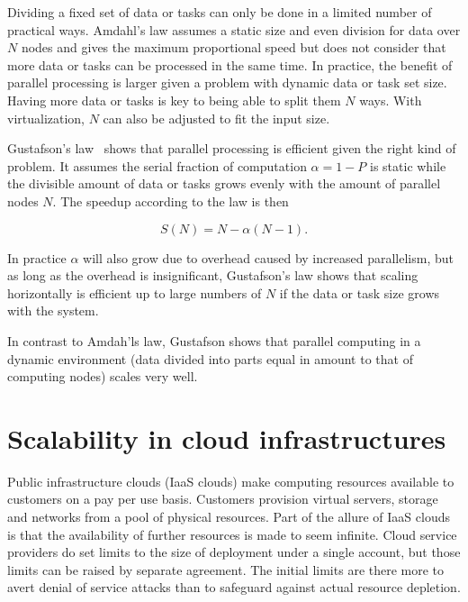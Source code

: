 \documentclass[english]{tktltiki2}
\theoremstyle{definition}
\theoremstyle{remark}
\begin{document}
Dividing a fixed set of data or tasks can only be done in a limited number of
practical ways. Amdahl’s law assumes a static size and even division for data
over $N$ nodes and gives the maximum proportional speed but does not consider
that more data or tasks can be processed in the same time. In practice, the
benefit of parallel processing is larger given a problem with dynamic data or
task set size. Having more data or tasks is key to being able to split them $N$
ways. With virtualization, $N$ can also be adjusted to fit the input size.

Gustafson’s law~\cite{gustafsonslaw} shows that parallel processing is efficient
given the right kind of problem. It assumes the serial fraction of computation
$\alpha=1-P$ is static while the divisible amount of data or tasks grows evenly
with the amount of parallel nodes $N$. The speedup  according to the law is then

\[
S(N) = N - \alpha(N-1).
\]

In practice $\alpha$ will also grow due to overhead caused by increased
parallelism, but as long as the overhead is insignificant, Gustafson’s law shows
that scaling horizontally is efficient up to large numbers of $N$ if the data or
task size grows with the system.

In contrast to Amdah’ls law, Gustafson shows that parallel computing in a
dynamic environment (data divided into parts equal in amount to that of
computing nodes) scales very well.




\section{Scalability in cloud infrastructures}
\label{sec:cloudscalability}

Public infrastructure clouds (IaaS clouds) make computing resources available to
customers on a pay per use basis. Customers provision virtual servers, storage
and networks from a pool of physical resources. Part of the allure of IaaS
clouds is that the availability of further resources is made to seem infinite.
Cloud service providers do set limits to the size of deployment under a single
account, but those limits can be raised by separate agreement. The initial
limits are there more to avert denial of service attacks than to safeguard
against actual resource depletion.
\end{document}
